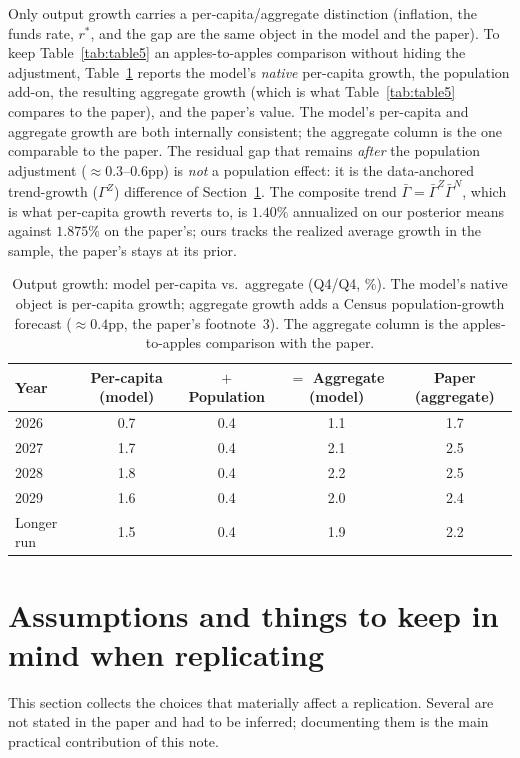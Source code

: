 \documentclass[11pt]{article}
\theoremstyle{definition}
\newcommand{\rstar}{r^{*}}
\begin{document}
Only output growth carries a per-capita/aggregate distinction (inflation, the funds rate, $\rstar$, and
the gap are the same object in the model and the paper). To keep Table~\ref{tab:table5} an
apples-to-apples comparison without hiding the adjustment, Table~\ref{tab:growth-decomp} reports the
model's \emph{native} per-capita growth, the population add-on, the resulting aggregate growth (which
is what Table~\ref{tab:table5} compares to the paper), and the paper's value. The model's per-capita
and aggregate growth are both internally consistent; the aggregate column is the one comparable to the
paper. The residual gap that remains \emph{after} the population adjustment ($\approx 0.3$--$0.6$pp) is
\emph{not} a population effect: it is the data-anchored trend-growth ($\Gamma^Z$) difference of
Section~\ref{sec:assumptions}. The composite trend $\bar\Gamma=\bar\Gamma^Z\bar\Gamma^N$, which is what
per-capita growth reverts to, is $1.40\%$ annualized on our posterior means against $1.875\%$ on the
paper's; ours tracks the realized average growth in the sample, the paper's stays at its prior.

\begin{table}[H]
\centering
\caption{Output growth: model per-capita vs.\ aggregate (Q4/Q4, \%). The model's native object is
per-capita growth; aggregate growth adds a Census population-growth forecast ($\approx 0.4$pp, the
paper's footnote~3). The aggregate column is the apples-to-apples comparison with the paper.}
\label{tab:growth-decomp}
\begin{tabular}{lcccc}
\toprule
Year & Per-capita (model) & $+$ Population & $=$ Aggregate (model) & Paper (aggregate) \\
\midrule
2026        & 0.7 & 0.4 & 1.1 & 1.7 \\
2027        & 1.7 & 0.4 & 2.1 & 2.5 \\
2028        & 1.8 & 0.4 & 2.2 & 2.5 \\
2029        & 1.6 & 0.4 & 2.0 & 2.4 \\
Longer run  & 1.5 & 0.4 & 1.9 & 2.2 \\
\bottomrule
\end{tabular}
\end{table}

\section{Assumptions and things to keep in mind when replicating}\label{sec:assumptions}
This section collects the choices that materially affect a replication. Several are not stated in the
paper and had to be inferred; documenting them is the main practical contribution of this note.
\end{document}
